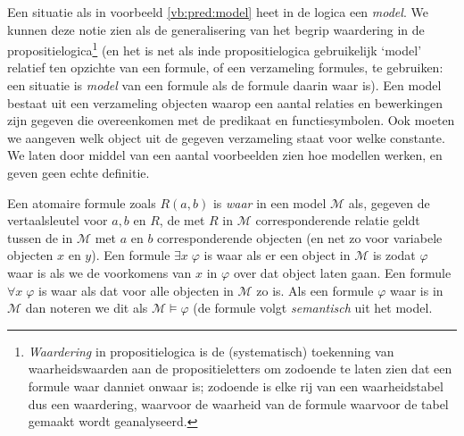 Een situatie als in voorbeeld \ref{vb:pred:model} heet in de logica een \textit{model}. We kunnen deze notie zien als de generalisering van het begrip waardering in de propositielogica\footnote{\textit{Waardering} in propositielogica is de (systematisch) toekenning van waarheidswaarden aan de propositieletters om zodoende te laten zien dat een formule waar danniet onwaar is; zodoende is elke rij van een waarheidstabel dus een waardering, waarvoor de waarheid van de formule waarvoor de tabel gemaakt wordt geanalyseerd.} (en het is net als inde propositielogica gebruikelijk `model' relatief ten opzichte van een formule, of een verzameling formules, te gebruiken: een situatie is \textit{model} van een formule als de formule daarin waar is). Een model bestaat uit een verzameling objecten waarop een aantal relaties en bewerkingen zijn gegeven die overeenkomen met de predikaat en functiesymbolen. Ook moeten we aangeven welk object uit de gegeven verzameling staat voor welke constante. We laten door middel van een aantal voorbeelden zien hoe modellen werken, en geven geen echte definitie.

Een atomaire formule zoals $R(a,b)$ is \textit{waar} in een model $\mathcal M$ als, gegeven de vertaalsleutel voor $a, b$ en $R$, de met $R$ in $\mathcal M$ corresponderende relatie geldt tussen de in $\mathcal M$ met $a$ en $b$ corresponderende objecten (en net zo voor variabele objecten $x$ en $y$). Een formule $\exists x\;\varphi$ is waar als er een object in $\mathcal M$ is zodat $\varphi$ waar is als we de voorkomens van $x$ in $\varphi$ over dat object laten gaan. Een formule $\forall x\;\varphi$ is waar als dat voor alle objecten in $\mathcal M$ zo is. Als een formule $\varphi$ waar is in $\mathcal M$ dan noteren we dit als $\mathcal M \vDash \varphi$ (de formule volgt \emph{semantisch} uit het model.

